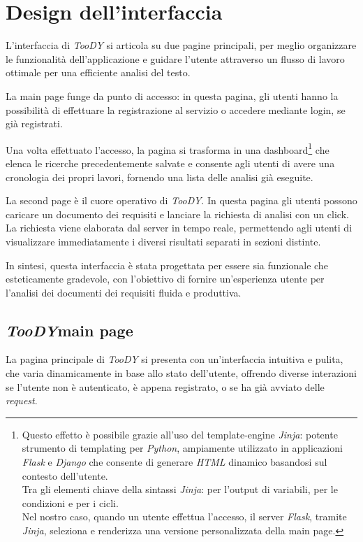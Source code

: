 \documentclass[12pt]{report}
\newcommand{\toody}{\textsl{TooDY}\xspace}
\newcommand{\python}{\textsl{Python}\xspace}
\newcommand{\jinja}{\textsl{Jinja}\xspace}
\newcommand{\flask}{\textsl{Flask}\xspace}
\newcommand{\django}{\textsl{Django}\xspace}
\newcommand{\html}{\textsl{HTML}\xspace}
\begin{document}
\section{Design dell'interfaccia}
L'interfaccia di \toody si articola su due pagine principali, per meglio organizzare le funzionalità dell'applicazione e guidare l'utente attraverso un flusso di lavoro ottimale per una efficiente analisi del testo.

La \textsf{main page} funge da punto di accesso: in questa pagina, gli utenti hanno la possibilità di effettuare la registrazione al servizio o accedere mediante login, se già registrati.

Una volta effettuato l'accesso, la pagina si trasforma in una dashboard\footnote{Questo effetto è possibile grazie all'uso del template-engine \jinja: potente strumento di templating per \python, ampiamente utilizzato in applicazioni \flask e \django che consente di generare \html dinamico basandosi sul contesto dell'utente.\\
Tra gli elementi chiave della sintassi \jinja: \texttt{\string{\string{ \string}\string}} per l'output di variabili, \texttt{} per le condizioni e \texttt{} per i cicli.\\
Nel nostro caso, quando un utente effettua l'accesso, il server \flask, tramite \jinja, seleziona e renderizza una versione personalizzata della main page.} che elenca le ricerche precedentemente salvate e consente agli utenti di avere una cronologia dei propri lavori, fornendo una lista delle analisi già eseguite.

La \textsf{second page} è il cuore operativo di \toody. In questa pagina gli utenti possono caricare un documento dei requisiti e lanciare la richiesta di analisi con un click. La richiesta viene elaborata dal server in tempo reale, permettendo agli utenti di visualizzare immediatamente i diversi risultati separati in sezioni distinte.

In sintesi, questa interfaccia è stata progettata per essere sia funzionale che esteticamente gradevole, con l'obiettivo di fornire un'esperienza utente per l'analisi dei documenti dei requisiti fluida e produttiva.


\subsection{\toody \textsf{main page}}
La pagina principale di \toody si presenta con un'interfaccia intuitiva e pulita, che varia dinamicamente in base allo stato dell'utente, offrendo diverse interazioni se l'utente non è autenticato, è appena registrato, o se ha già avviato delle \textit{request}.
\end{document}
